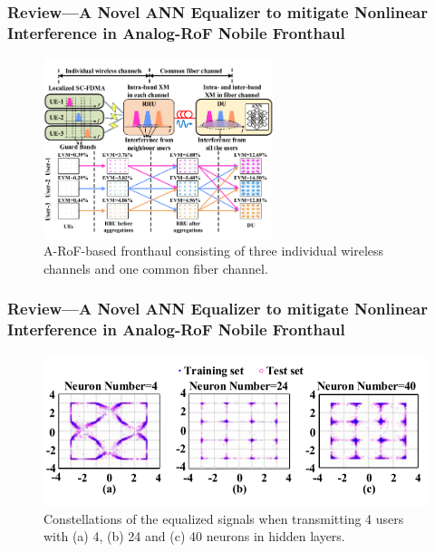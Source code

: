 \documentclass[t]{beamer}
\begin{document}
\begin{frame}
    \frametitle{Review---A Novel ANN Equalizer to mitigate Nonlinear Interference in Analog-RoF Nobile Fronthaul~\cite{Liu2018a}}
    \begin{figure}
        \includegraphics[width=0.6\textwidth]{novelANN.PNG}
        \caption{A-RoF-based fronthaul consisting of three individual wireless channels and one common fiber channel.}
    \end{figure}
\end{frame}

\begin{frame}
    \frametitle{Review---A Novel ANN Equalizer to mitigate Nonlinear Interference in Analog-RoF Nobile Fronthaul~\cite{Liu2018a}}
    \begin{figure}
        \includegraphics[width=\textwidth]{novelANNTraining.PNG}
        \caption{Constellations of the equalized signals when transmitting 4 users with (a) 4, (b) 24 and (c) 40 neurons in hidden layers.}
    \end{figure}
\end{frame}
\end{document}
